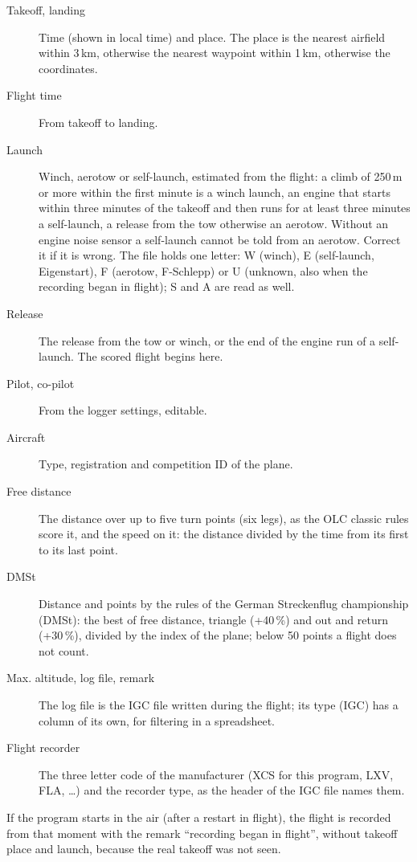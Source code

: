 \begin{description}
\item[Takeoff, landing]  Time (shown in local time) and place.  The
  place is the nearest airfield within 3\,km, otherwise the nearest
  waypoint within 1\,km, otherwise the coordinates.
\item[Flight time]  From takeoff to landing.
\item[Launch]  Winch, aerotow or self-launch, estimated from the
  flight: a climb of 250\,m or more within the first minute is a winch
  launch, an engine that starts within three minutes of the takeoff
  and then runs for at least three minutes a self-launch, a release
  from the tow otherwise an aerotow.  Without an engine noise sensor a
  self-launch cannot be told from an aerotow.  Correct
  it if it is wrong.  The file holds one letter: W (winch), E
  (self-launch, Eigenstart), F (aerotow, F-Schlepp) or U (unknown,
  also when the recording began in flight); S and A are read as well.
\item[Release]  The release from the tow or winch, or the end of the
  engine run of a self-launch.  The scored flight begins here.
\item[Pilot, co-pilot]  From the logger settings, editable.
\item[Aircraft]  Type, registration and competition ID of the plane.
\item[Free distance]  The distance over up to five turn points (six
  legs), as the OLC classic rules score it, and the speed on it: the
  distance divided by the time from its first to its last point.
\item[DMSt]  Distance and points by the rules of the German
  Streckenflug championship (DMSt): the best of free distance,
  triangle (+40\,\%) and out and return (+30\,\%), divided by the index
  of the plane; below 50 points a flight does not count.
\item[Max. altitude, log file, remark]  The log file is the IGC file
  written during the flight; its type (IGC) has a column of its own,
  for filtering in a spreadsheet.
\item[Flight recorder]  The three letter code of the manufacturer
  (XCS for this program, LXV, FLA, \ldots) and the recorder type, as
  the header of the IGC file names them.
\end{description}

If the program starts in the air (after a restart in flight), the
flight is recorded from that moment with the remark ``recording began
in flight'', without takeoff place and launch, because the real
takeoff was not seen.

